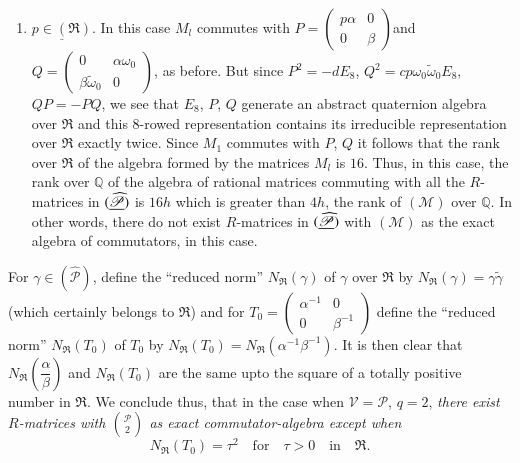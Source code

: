 \begin{enumerate}
\item $\underline{p\in(\mathfrak{R})}$. In this case $M_{l}$ commutes
  with $P=\left(\begin{smallmatrix} p\alpha & 0\\ 0 & \beta
  \end{smallmatrix}\right)$\pageoriginale and
  $Q=\left(\begin{smallmatrix} 0 &
    \alpha\omega_{0}\\ \beta\widetilde{\omega}_{0} & 0
  \end{smallmatrix}\right)$, as before. But since $P^{2}=-dE_{8}$,
  $Q^{2}=cp\omega_{0}\widetilde{\omega}_{0}E_{8}$, $QP=-PQ$, we see
  that $E_{8}$, $P$, $Q$ generate an abstract quaternion algebra over
  $\mathfrak{R}$ and this $8$-rowed representation contains its
  irreducible representation over $\mathfrak{R}$ exactly twice. Since
  $M_{1}$ commutes with $P$, $Q$ it follows that the rank over
  $\mathfrak{R}$ of the algebra formed by the matrices $M_{l}$ is
  $16$. Thus, in this case, the rank over $\mathbb{Q}$ of the algebra
  of rational matrices commuting with all the $R$-matrices in
  $(\underline{\widehat{\mathscr{P}}})$ is $16h$ which is greater than $4h$,
  the rank of $(\mathscr{M})$ over $\mathbb{Q}$. In other words, there
  do not exist $R$-matrices in $(\underline{\widehat{\mathscr{P}}})$ with
  $(\mathscr{M})$ as the exact algebra of commutators, in this case.
\end{enumerate}

For $\gamma\in(\widehat{\mathscr{P}})$, define the ``reduced norm''
$N_{\mathfrak{R}}(\gamma)$ of $\gamma$ over $\mathfrak{R}$ by
$N_{\mathfrak{R}}(\gamma)=\gamma\widetilde{\gamma}$ (which certainly
belongs to $\mathfrak{R}$) and for $T_{0}=\left(\begin{smallmatrix}
  \alpha^{-1} & 0\\ 0 & \beta^{-1}\end{smallmatrix}\right)$ define the
``reduced norm'' $N_{\mathfrak{R}}(T_{0})$ of $T_{0}$ by
$N_{\mathfrak{R}}(T_{0})=N_{\mathfrak{R}}(\alpha^{-1}\beta^{-1})$. It
is then clear that
$N_{\mathfrak{R}}\left(\dfrac{\alpha}{\beta}\right)$ and
$N_{\mathfrak{R}}(T_{0})$ are the same upto the square of a totally
positive number in $\mathfrak{R}$. We conclude thus, that in the case
when $\mathscr{V}=\mathscr{P}$, $q=2$, {\em there exist $R$-matrices
  with $\binom{\mathscr{P}}{2}$ as exact commutator-algebra except
  when}
$$
N_{\mathfrak{R}}(T_{0})=\tau^{2}\quad\text{for}\quad
\tau>0\quad\text{in}\quad \mathfrak{R}. 
$$

